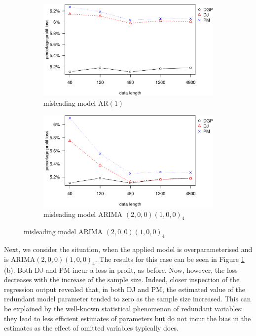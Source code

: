 \documentclass{article}
\begin{document}
\begin{figure}
\centering
\caption{Percentage profit loss vs. data size in misleading model}
\begin{subfigure}[b]{0.48\textwidth}
\centering
\includegraphics[width=\textwidth]{information-plot_files/figure-latex/AR(1)-1.pdf}
\caption{misleading model AR$(1)$}
\end{subfigure}
\hfill
\begin{subfigure}[b]{0.48\textwidth}
\centering
\includegraphics[width=\textwidth]{information-plot_files/figure-latex/SAR(3)(1)_4-1.pdf}
\caption{misleading model ARIMA $(2,0,0)(1,0,0)_4$}
\end{subfigure}
\label{fig:mis}
\end{figure}

Next, we consider the situation, when the applied model is overparameterised and is ARIMA$(2,0,0)(1,0,0)_4$. The results for this case can be seen in Figure \ref{fig:mis} (b). Both DJ and PM incur a loss in profit, as before. Now, however, the loss decreases with the increase of the sample size. Indeed, closer inspection of the regression output revealed that, in both DJ and PM, the estimated value of the redundant model parameter tended to zero as the sample size increased. This can be explained by the well-known statistical phenomenon of redundant variables: they lead to less efficient estimates of parameters but do not incur the bias in the estimates as the effect of omitted variables typically does.
\end{document}
